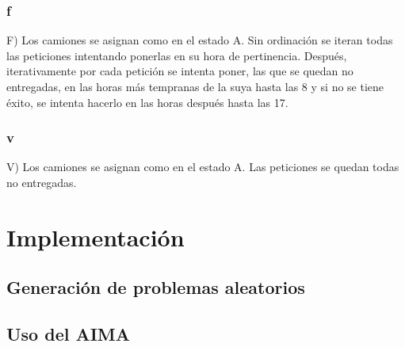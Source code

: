 \documentclass{article}
\begin{document}
\subsubsection{f}
F) Los camiones se asignan como en el estado A. Sin ordinación se iteran todas las peticiones intentando ponerlas en su hora de pertinencia. Después, iterativamente por cada petición se intenta poner, las que se quedan no entregadas, en las horas más tempranas de la suya hasta las 8 y si no se tiene éxito, se intenta hacerlo en las horas después hasta las 17.

\subsubsection{v}
V) Los camiones se asignan como en el estado A. Las peticiones se quedan todas no entregadas.


\section{Implementación}

\subsection{Generación de problemas aleatorios}

\subsection{Uso del AIMA}
\end{document}
